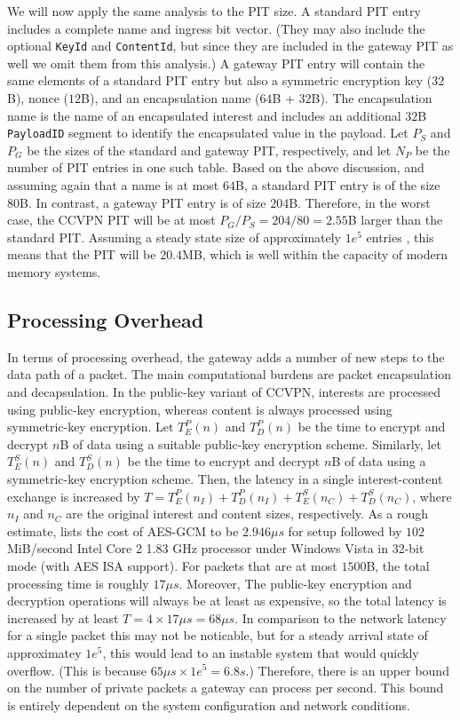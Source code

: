 We will now apply the same analysis to the PIT size. A standard PIT entry includes a 
complete name and ingress bit vector. (They may also include the optional {\tt KeyId}
and {\tt ContentId}, but since they are included in the gateway PIT as well we omit them
from this analysis.) A gateway PIT entry will contain the same elements of a standard
PIT entry but also a symmetric encryption key ($32$B), nonce ($12$B), and an 
encapsulation name ($64$B + $32$B).
The encapsulation name is the name of an encapsulated interest and includes an additional
$32$B {\tt PayloadID} segment to identify the encapsulated value in the payload. Let 
$P_S$ and $P_G$ be the sizes of the standard and gateway PIT, respectively, and let $N_P$ 
be the number of PIT entries in one such table. Based on the above discussion, and assuming
again that a name is at most $64$B, a standard PIT entry is of the size $80$B. In contrast,
a gateway PIT entry is of size $204$B. Therefore, in the worst case, the CCVPN PIT
will be at most $P_G / P_S = 204/80 = 2.55$B larger than the standard PIT. Assuming 
a steady state size of approximately $1e^5$ entries \cite{carofiglio2015pending}, 
this means that the PIT will be $20.4$MB, which is well within the capacity of 
modern memory systems. 

\subsection{Processing Overhead}
In terms of processing overhead, the gateway adds a number of new steps to the data
path of a packet. The main computational burdens are packet encapsulation and decapsulation.
In the public-key variant of CCVPN, interests are processed using public-key encryption, 
whereas content is always processed using symmetric-key encryption. Let $T_E^P(n)$ and $T_D^P(n)$
be the time to encrypt and decrypt $n$B of data using a suitable public-key encryption scheme.
Similarly, let $T_E^S(n)$ and $T_D^S(n)$ be the time to encrypt and decrypt $n$B of data
using a symmetric-key encryption scheme. Then, the latency in a single interest-content
exchange is increased by $T = T_E^P(n_I) + T_D^P(n_I) + T_E^S(n_C) + T_D^S(n_C)$, where
$n_I$ and $n_C$ are the original interest and content sizes, respectively. As a rough
estimate, \cite{benchmarks} lists the cost of AES-GCM to be $2.946\mu s$ for setup
followed by $102$MiB/second Intel Core 2 1.83 GHz processor under Windows Vista in 
32-bit mode (with AES ISA support). For packets that are at most $1500$B,
the total processing time is roughly $17\mu s$. Moreover, The public-key encryption and 
decryption operations will always be at least as expensive, so the total latency is 
increased by at least $T = 4 \times 17\mu s = 68 \mu s$. In comparison to the network
latency for a single packet this may not be noticable, but for a steady arrival state of
approximatey $1e^5$, this would lead to an instable system that would quickly overflow.
(This is because $65 \mu s \times 1e^5 = 6.8s$.) Therefore, there is an upper bound on
the number of private packets a gateway can process per second. This bound is entirely
dependent on the system configuration and network conditions.

